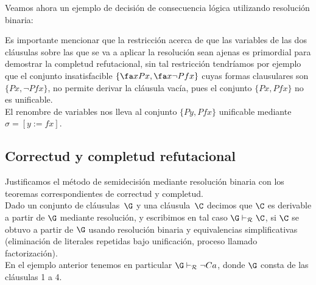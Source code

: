 \documentclass[11pt,letterpaper]{article}
\begin{document}
\noindent Veamos ahora un ejemplo de decisión de consecuencia lógica utilizando 
resoluci\'on binaria:

Es importante mencionar que la restricción acerca de que las variables de las 
dos cláusulas sobre las que se va a aplicar la resolución sean ajenas es 
primordial para demostrar la completud refutacional, sin tal restricción 
tendr\'iamos por ejemplo que el conjunto insatisfacible 
$\{\fa x Px,\fa x \neg Pfx\}$  cuyas formas clausulares son $\{Px,\neg Pfx\}$, 
no permite derivar la cláusula vacía, pues el conjunto $\{Px,Pfx\}$ no es 
unificable.\\
El renombre de variables nos lleva al conjunto $\{Py,Pfx\}$ unificable
mediante $\sigma=[y:=fx]$.

\subsection{Correctud y completud refutacional}

Justificamos el método de semidecisión mediante resolución binaria con los 
teoremas correspondientes de correctud y completud. \\

Dado un conjunto de cláusulas~$\G$ y una cláusula~$\C$ decimos que $\C$ es
derivable a partir de $\G$ mediante resolución, y escribimos en tal caso
$\G\vdash_\mathcal{R}\C$, si $\C$ se obtuvo a partir de $\G$ usando
resolución binaria y equivalencias simplificativas (eliminación de literales
repetidas bajo unificación, proceso llamado factorización). \\
En el ejemplo anterior tenemos en particular $\G\vdash_\mathcal{R} \neg Ca$, 
donde $\G$ consta de las cláusulas 1 a 4.
\end{document}
